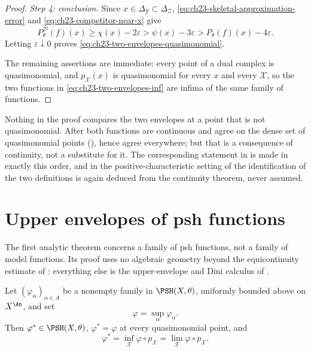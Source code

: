 \begin{proof}
\emph{Step 4: conclusion.}  Since \(x\in\Delta_{\mathcal Y}\subset
\Delta_{\mathcal Z}\), \eqref{eq:ch23-skeletal-approximation-error} and
\eqref{eq:ch23-competitor-near-x} give
\[
 P^{\mathcal D}_\theta(f)(x)
 \geq\chi(x)-2\varepsilon
 >\psi(x)-3\varepsilon
 >P_\theta(f)(x)-4\varepsilon .
\]
Letting \(\varepsilon\downarrow0\) proves
\eqref{eq:ch23-two-envelopes-quasimonomial}.

The remaining assertions are immediate: every point of a dual complex is
quasimonomial, and \(p_{\mathcal X}(x)\) is quasimonomial for every \(x\) and
every \(\mathcal X\), so the two functions in
\eqref{eq:ch23-two-envelopes-inf} are infima of the same family of
functions.
\end{proof}

\begin{remark}
\label{rem:ch23-two-envelopes-scope}
Nothing in the proof compares the two envelopes at a point that is not
quasimonomial.  After  both functions are
continuous and agree on the dense set of quasimonomial points
(), hence agree everywhere; but that is a
consequence of continuity, not a substitute for it.  The corresponding
statement in \cite[Definition~2.8 and the discussion after it]{GJKM19} is
made in exactly this order, and in the positive-characteristic setting of
 the identification of the two definitions is again
deduced from the continuity theorem, never assumed.
\end{remark}

\section{Upper envelopes of psh functions}
\label{sec:ch23-upper-envelopes}

The first analytic theorem concerns a family of psh functions, not a family
of model functions.  Its proof uses no algebraic geometry beyond the
equicontinuity estimate of : everything
else is the upper-envelope and Dini calculus of
.

\begin{theorem}\label{thm:ch23-upper-envelope}
Let \((\varphi_\alpha)_{\alpha\in A}\) be a nonempty family in
\(\PSH(X,\theta)\), uniformly bounded above on \(X^{\An}\), and set
\begin{equation}\label{eq:ch23-raw-psh-sup}
                         \varphi=\sup_\alpha\varphi_\alpha.
\end{equation}
Then \(\varphi^*\in\PSH(X,\theta)\),
\(\varphi^*=\varphi\) at every quasimonomial point, and
\begin{equation}\label{eq:ch23-upper-envelope-reconstruction}
 \varphi^*
   =\inf_{\mathcal X}\varphi\circ p_{\mathcal X}
   =\lim_{\mathcal X}\varphi\circ p_{\mathcal X}.
\end{equation}
\end{theorem}


